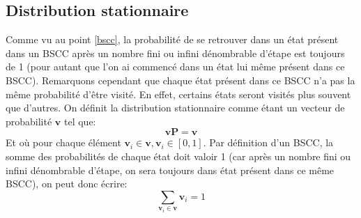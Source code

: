 \documentclass[letterpaper]{article}
\begin{document}
  \subsection{Distribution stationnaire}
    Comme vu au point \ref{bscc}, la probabilité de se retrouver dans un état
    présent dans un BSCC après un nombre fini ou infini dénombrable d'étape est
    toujours de 1 (pour autant que l'on ai commencé dans un état lui même présent
    dans ce BSCC).  Remarquons cependant que chaque état présent dans ce BSCC n'a 
    pas la même probabilité d'être visité.  En effet, certains états seront 
    visités plus souvent que d'autres.
    On définit la distribution stationnaire comme étant un vecteur de probabilité
    $\mathbf{v}$ tel que:
    $$\mathbf{v}\mathbf{P} = \mathbf{v}$$
    Et où pour chaque élément $\mathbf{v}_i \in \mathbf{v}, \mathbf{v}_i \in [0, 1]$.
    Par définition d'un BSCC, la somme des probabilités de chaque état doit valoir 1
    (car après un nombre fini ou infini dénombrable d'étape, on sera toujours dans
    état présent dans ce même BSCC), on peut donc écrire:
    $$\sum\limits_{\mathbf{v}_i \in \mathbf{v}} \mathbf{v}_i = 1$$
    
\end{document}

